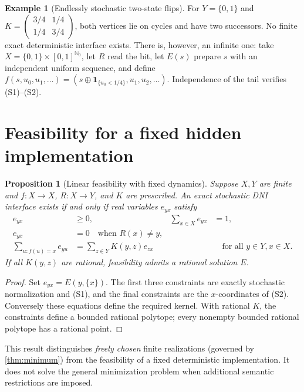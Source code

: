 \documentclass[11pt,letterpaper]{article}
\newtheorem{proposition}[theorem]{Proposition}
\theoremstyle{definition}\newtheorem{definition}[theorem]{Definition}
\newtheorem{example}[theorem]{Example}
\theoremstyle{remark}\newtheorem{remark}[theorem]{Remark}
\newcommand{\N}{\mathbb{N}}
\newcommand{\one}{\mathbf{1}}
\begin{document}
\begin{example}[Endlessly stochastic two-state flips]\label{ex:flip}
For $Y=\{0,1\}$ and $K=\left(\begin{smallmatrix}3/4&1/4\\1/4&3/4\end{smallmatrix}\right)$, both vertices lie on cycles and have two successors. No finite exact deterministic interface exists. There is, however, an infinite one: take $X=\{0,1\}\times[0,1]^{\N_0}$, let $R$ read the bit, let $E(s)$ prepare $s$ with an independent uniform sequence, and define $f(s,u_0,u_1,\ldots)=(s\oplus\one_{\{u_0<1/4\}},u_1,u_2,\ldots)$. Independence of the tail verifies (S1)--(S2).
\end{example}

\section{Feasibility for a fixed hidden implementation}
\begin{proposition}[Linear feasibility with fixed dynamics]\label{prop:lp}
Suppose $X,Y$ are finite and $f:X\to X$, $R:X\to Y$, and $K$ are prescribed. An exact stochastic DNI interface exists if and only if real variables $e_{yx}$ satisfy
\begin{align*}
e_{yx}&\ge0, &\sum_{x\in X}e_{yx}&=1,\\
e_{yx}&=0\quad\text{when }R(x)\ne y, &&\\
\sum_{u:f(u)=x}e_{yu}&=\sum_{z\in Y}K(y,z)e_{zx}&&\quad\text{for all }y\in Y,x\in X.
\end{align*}
If all $K(y,z)$ are rational, feasibility admits a rational solution $E$.
\end{proposition}
\begin{proof}
Set $e_{yx}=E(y,\{x\})$. The first three constraints are exactly stochastic normalization and (S1), and the final constraints are the $x$-coordinates of (S2). Conversely these equations define the required kernel. With rational $K$, the constraints define a bounded rational polytope; every nonempty bounded rational polytope has a rational point.
\end{proof}
This result distinguishes \emph{freely chosen} finite realizations (governed by \cref{thm:minimum}) from the feasibility of a fixed deterministic implementation. It does not solve the general minimization problem when additional semantic restrictions are imposed.
\end{document}
